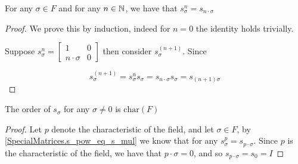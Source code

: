 \begin{lemma}
    \label{SpecialMatrices.s_pow_eq_s_mul}
    \leanok
    For any $\sigma \in F$ and for any $n \in \mathbb{N}$, we have that $s_\sigma^n = s_{n \cdot \sigma}$
\end{lemma}
\begin{proof}
\leanok
    We prove this by induction, indeed for $n= 0$ the identity holds trivially.

    Suppose $s_\sigma^n = \begin{bmatrix}
        1 & 0\\
        n \cdot \sigma & 0\end{bmatrix}$ then consider $s_\sigma^{(n + 1)}$. Since 

        \[
        s_\sigma^{(n + 1)} = s_\sigma^n s_\sigma = s_{n \cdot \sigma} s_\sigma = s_{(n + 1)\sigma}
        \]
\end{proof}


\begin{lemma}
    \label{SpecialMatrices.order_s_eq_char}
    \leanok
    The order of $s_\sigma$ for any $\sigma \ne 0$ is $\textrm{char}(F)$
    \end{lemma}
    
    \begin{proof}
    \leanok
    Let $p$ denote the characteristic of the field, and let $\sigma \in F$, by \ref{SpecialMatrices.s_pow_eq_s_mul} we know that for any $s_\sigma^p = s_{p \cdot \sigma}$. 
    Since $p$ is the characteristic of the field, we have that $p \cdot \sigma = 0$, and so $s_{p \cdot \sigma} = s_0 = I$
    \end{proof}


